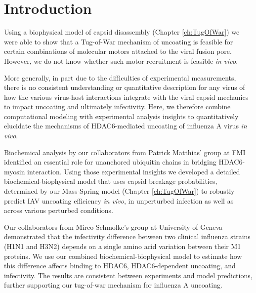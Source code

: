 \section{Introduction}

Using a biophysical model of capsid disassembly (Chapter \ref{ch:TugOfWar}) we were able to show that a Tug-of-War mechanism of uncoating is feasible for certain combinations of molecular motors attached to the viral fusion pore. However, we do not know whether such motor recruitment is feasible \textit{in vivo}.

More generally, in part due to the difficulties of experimental measurements, there is no consistent understanding or quantitative description for any virus of how the various virus-host interactions integrate with the viral capsid mechanics to impact uncoating and ultimately infectivity. Here, we therefore combine computational modeling with experimental analysis insights to quantitatively elucidate the mechanisms of HDAC6-mediated uncoating of influenza A virus \textit{in vivo}. 

Biochemical analysis by our collaborators from Patrick Matthias' group at FMI identified an essential role for unanchored ubiquitin chains in bridging HDAC6-myosin interaction. Using those experimental insights we developed a detailed biochemical-biophysical model that uses capsid breakage probabilities, determined by our Mass-Spring model (Chapter \ref{ch:TugOfWar}) to robustly predict IAV uncoating efficiency \textit{in vivo}, in unperturbed infection as well as across various perturbed conditions.

Our collaborators from Mirco Schmolke's group at University of Geneva demonstrated that the infectivity difference between two clinical influenza strains (H1N1 and H3N2) depends on a single amino acid variation between their M1 proteins. We use our combined biochemical-biophysical model to estimate how this difference affects binding to HDAC6, HDAC6-dependent uncoating, and infectivity. The results are consistent between experiments and model predictions, further supporting our tug-of-war mechanism for influenza A uncoating.